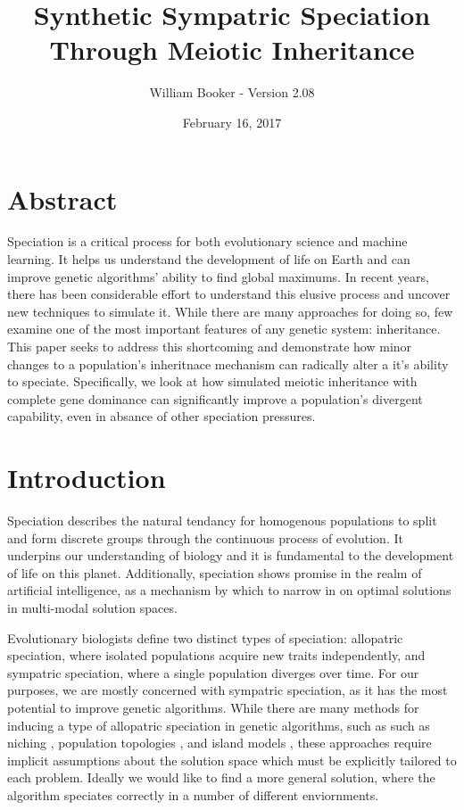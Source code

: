 \documentclass{article}
\title{Synthetic Sympatric Speciation Through Meiotic Inheritance}
\author{William Booker - Version 2.08}
\date{February 16, 2017}
\newcommand\TODO[1]{\textcolor{red}{#1}}
\begin{document}
\maketitle


\section{Abstract}

Speciation is a critical process for both evolutionary science and machine learning. It helps us understand the development of life on Earth and can improve genetic algorithms' ability to find global maximums. In recent years, there has been considerable effort to understand this elusive process and uncover new techniques to simulate it. While there are many approaches for doing so, few examine one of the most important features of any genetic system: inheritance. This paper seeks to address this shortcoming and demonstrate how minor changes to a population's inheritnace mechanism can radically alter a it's ability to speciate. Specifically, we look at how simulated meiotic inheritance with complete gene dominance can significantly improve a population's divergent capability, even in absance of other speciation pressures. 



\section{Introduction}

Speciation describes the natural tendancy for homogenous populations to split and form discrete groups through the continuous process of evolution. \cite{SPBOOK} It underpins our understanding of biology and it is fundamental to the development of life on this planet. Additionally, speciation shows promise in the realm of artificial intelligence, as a mechanism by which to narrow in on optimal solutions in multi-modal solution spaces.

Evolutionary biologists define two distinct types of speciation: allopatric speciation, where isolated populations acquire new traits independently, and sympatric speciation, where a single population diverges over time. For our purposes, we are mostly concerned with sympatric speciation, as it has the most potential to improve genetic algorithms. While there are many methods for inducing a type of allopatric speciation in genetic algorithms, such as such as niching \cite{NICHING}, population topologies \cite{TOPOLOGIES}, and island models \cite{ISLAND}, these approaches require implicit assumptions about the solution space which must be explicitly tailored to each problem. Ideally we would like to find a more general solution, where the algorithm speciates correctly in a number of different enviornments. 
\end{document}
